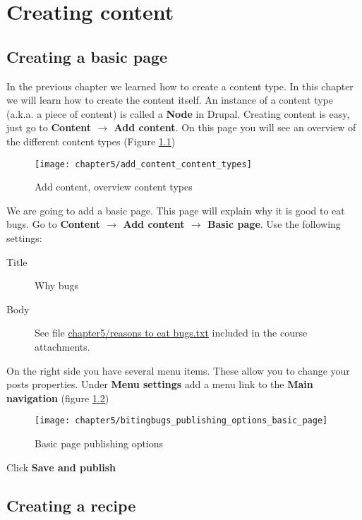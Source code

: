\chapter{Creating content}

\section{Creating a basic page}

In the previous chapter we learned how to create a content type. In this chapter we will learn how to create the content itself. An instance of a content type (a.k.a. a piece of content) is called a \textbf{Node} in Drupal. Creating content is easy, just go to \textbf{Content $\rightarrow$ Add content}. On this page you will see an overview of the different content types (Figure \ref{fig:add_content_content_types})


  \begin{figure}[H]
  	\centering
  	\texttt{[image: chapter5/add\_content\_content\_types]}
  	\caption{Add content, overview content types}
  	\label{fig:add_content_content_types}
  \end{figure}
  
  We are going to add a basic page. This page will explain why it is good to eat bugs. Go to \textbf{Content $\rightarrow$ Add content $\rightarrow$ Basic page}. Use the following settings: 
  
  \begin{description}
  	\item[Title] Why bugs
  	\item[Body] See file \url{chapter5/reasons to eat bugs.txt} included in the course attachments.
  \end{description}
  
  On the right side you have several menu items. These allow you to change your posts properties. Under \textbf{Menu settings} add a menu link to the \textbf{Main navigation} (figure \ref{fig:bitingbugs_publishing_options_basic_page})
  
  \begin{figure}[H]
  	\centering
  	\texttt{[image: chapter5/bitingbugs\_publishing\_options\_basic\_page]}
  	\caption{Basic page publishing options}
  	\label{fig:bitingbugs_publishing_options_basic_page}
  \end{figure}
  
  Click \textbf{Save and publish}
  
  \section{Creating a recipe}
  
